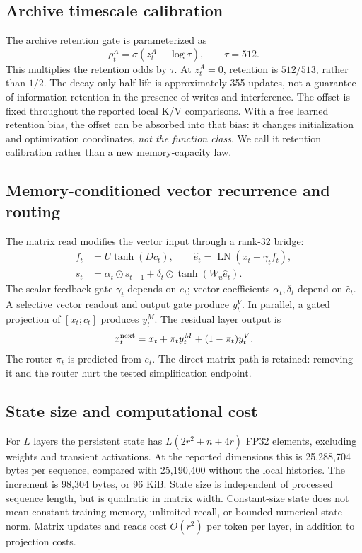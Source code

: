 \documentclass[10pt]{article}
\newcommand{\LN}{\operatorname{LN}}
\newcommand{\sig}{\sigma}
\begin{document}
\subsection{Archive timescale calibration}
The archive retention gate is parameterized as
\begin{equation}
 \rho_t^A=\sig(z_t^A+\log\tau),\qquad \tau=512.
 \label{eq:clock}
\end{equation}
This multiplies the retention odds by $\tau$. At $z_t^A=0$, retention is
$512/513$, rather than $1/2$. The decay-only half-life is approximately 355
updates, not a guarantee of information retention in the presence of writes and
interference. The offset is fixed throughout the reported local K/V comparisons.
With a free learned retention bias, the offset can be absorbed into that bias:
it changes initialization and optimization coordinates, \emph{not the function
class}. We call it retention calibration rather than a new memory-capacity law.

\subsection{Memory-conditioned vector recurrence and routing}
The matrix read modifies the vector input through a rank-32 bridge:
\begin{align}
 f_t &= U\tanh(Dc_t),\qquad
 \widehat e_t=\LN(x_t+\gamma_t f_t),\\
 s_t &= \alpha_t\odot s_{t-1}
           +\delta_t\odot\tanh(W_u\widehat e_t). \label{eq:vector}
\end{align}
The scalar feedback gate $\gamma_t$ depends on $e_t$; vector coefficients
$\alpha_t,\delta_t$ depend on $\widehat e_t$. A selective vector readout and
output gate produce $y_t^V$. In parallel, a gated projection of $[x_t;c_t]$
produces $y_t^M$. The residual layer output is
\begin{equation}
 x_t^{\rm next}=x_t+\pi_t y_t^M+(1-\pi_t)y_t^V.
\end{equation}
The router $\pi_t$ is predicted from $e_t$. The direct matrix path is retained:
removing it and the router hurt the tested simplification endpoint.

\subsection{State size and computational cost}
For $L$ layers the persistent state has $L(2r^2+n+4r)$ FP32 elements, excluding
weights and transient activations. At the reported dimensions this is 25,288,704
bytes per sequence, compared with 25,190,400 without the local histories. The
increment is 98,304 bytes, or 96 KiB. State size is independent of processed
sequence length, but is quadratic in matrix width. Constant-size state does not
mean constant training memory, unlimited recall, or bounded numerical state
norm. Matrix updates and reads cost $O(r^2)$ per token per layer, in addition to
projection costs.
\end{document}
